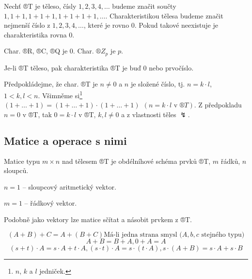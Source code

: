\documentclass[12pt]{article}					%
\begin{document}

    \begin{definice}
        Nechť ®T je těleso, čísly $1, 2, 3, 4, …$ budeme značit součty $1, 1+1, 1+1+1, 1+1+1+1, …$. Charakteristikou tělesa budeme značit nejmenší číslo z $1, 2, 3, 4, …$, které je rovno 0. Pokud takové neexistuje je charakteristika rovna 0.

        \begin{prikladyin}
            Char. ®R, ®C, ®Q je 0. Char. $®Z_p$ je $p$.
        \end{prikladyin}
    \end{definice}

    \begin{tvrzeni}
        Je-li ®T těleso, pak charakteristika ®T je buď 0 nebo prvočíslo.
        \begin{dukazin}[Sporem]
                Předpokládejme, že char. ®T je $n≠0$ a $n$ je složené číslo, tj. $n = k\cdot l$, $1<k, l<n$. Všimněme si\footnote{$n$, $k$ a $l$ jedniček.} $(1+…+1) = (1+…+1) \cdot(1+…+1)\ \ (n=k\cdot l\text{ v }®T)$. Z předpokladu $n=0$ v ®T, tak $0=k\cdot l$ v ®T, $k,l ≠ 0$ a z vlastnosti těles $\lightning$.
        \end{dukazin}
    \end{tvrzeni}

    \subsection{Matice a operace s nimi}
        \begin{definice}
            Matice typu $m \times n$ nad tělesem ®T je obdélníhové schéma prvků ®T, $m$ řádků, $n$ sloupců.
        \end{definice}

        \begin{poznamka}
            $n=1$ -- sloupcový aritmetický vektor.

            $m=1$ -- řádkový vektor.
        \end{poznamka}

        \begin{poznamka}[Operace]
            Podobně jako vektory lze matice sčítat a násobit prvkem z ®T.
        \end{poznamka}

        \begin{veta}
            $$(A+B)+C = A+(B+C) \text{Má-li jedna strana smysl ($A, b, c$ stejného typu)}$$
            $$ A+B = B+A, 0+A=A $$ 
            $$ (s+t)\cdot A = s\cdot A + t\cdot A, (s\cdot t)\cdot A = s\cdot (t\cdot A), s\cdot (A+B) = s\cdot A + s\cdot B $$ 
        \end{veta}
\end{document}
